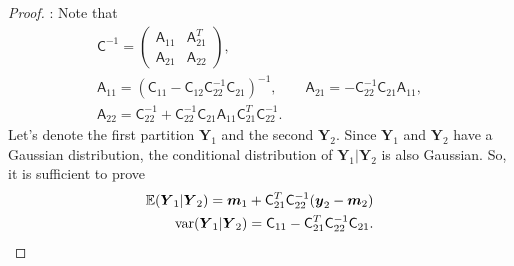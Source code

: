 \documentclass[twocolumn]{svjour3}          %
\newcommand{\bm}[1]{\boldsymbol{#1}}
\newcommand{\Ex}{\mathbb{E}}
\newcommand{\vm}{\bm{m}}
\newcommand{\vy}{\bm{y}}
\newcommand{\vY}{\bm{Y}}
\newcommand{\mA}{\mathsf{A}}
\newcommand{\mC}{\mathsf{C}}
\newcommand{\var}{{\textup{var}}}
\begin{document}
\begin{proof}:
Note that
	\begin{gather*}
	\mC^{-1} = \begin{pmatrix} \mA_{11} & \mA_{21}^T \\ \mA_{21} & \mA_{22} \end{pmatrix}, \\
	\mA_{11} = (\mC_{11} - \mC_{12} \mC_{22}^{-1} \mC_{21})^{-1}, \qquad 
	\mA_{21} = -  \mC_{22}^{-1} \mC_{21} \mA_{11}, \\ 
	\mA_{22} = \mC_{22}^{-1} + \mC_{22}^{-1} \mC_{21} \mA_{11} \mC_{21}^T \mC_{22}^{-1}.
	\end{gather*}
%
%
Let's denote the first partition $\vY_1$ and the second $\vY_2$. 
Since $\vY_1$ and $\vY_2$ have a Gaussian distribution, the conditional distribution of $\vY_1 \vert \vY_2$ is also Gaussian. So, it is sufficient to prove 
\begin{align*}
\Ex(\vY_1 \vert \vY_2) = \vm_1 + \mC_{21}^T \mC_{22}^{-1}(\vy_2 - \vm_2)
\\
\var(\vY_1 \vert \vY_2) = \mC_{11} - \mC_{21}^T \mC_{22}^{-1} \mC_{21}.
\end{align*}



\end{proof}
\end{document}
